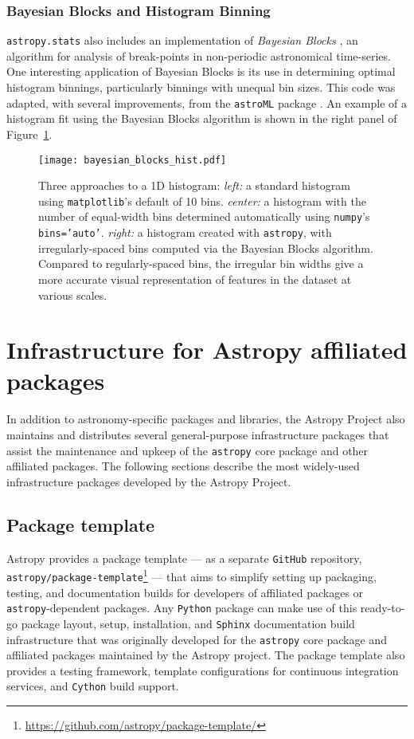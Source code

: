 \documentclass[modern]{aastex62}
\newcommand{\package}[1]{\texttt{#1}\xspace}
\newcommand{\github}{\package{GitHub}}
\newcommand{\python}{\package{Python}}
\newcommand{\astropy}{Astropy\xspace}
\newcommand{\astropypkg}{\package{astropy}}
\renewcommand{\figurename}{Figure\xspace}
\begin{document}
\subsubsection{Bayesian Blocks and Histogram Binning}
\package{astropy.stats} also includes an implementation of
{\it Bayesian Blocks} \citep{Scargle2013}, an algorithm for analysis of
break-points in non-periodic astronomical time-series. One interesting
application of Bayesian Blocks is its use in determining optimal histogram
binnings, particularly binnings with unequal bin sizes.
This code was adapted, with several improvements, from the \package{astroML}
package \citep{astroML}. An example of a histogram fit using the Bayesian
Blocks algorithm is shown in the right panel of
\figurename~\ref{fig:bayes-blocks-hist}.

\begin{figure}
\texttt{[image: bayesian\_blocks\_hist.pdf]}
\caption{%
    Three approaches to a 1D histogram:
    {\it left:} a standard histogram using \package{matplotlib}'s default of 10 bins.
    {\it center:} a histogram with the number of equal-width bins determined automatically using \package{numpy}'s {\tt bins='auto'}.
    {\it right:} a histogram created with \astropypkg, with irregularly-spaced bins computed via the Bayesian Blocks algorithm.
    Compared to regularly-spaced bins, the irregular bin widths give a more accurate visual representation of features in the dataset at various scales.
    \label{fig:bayes-blocks-hist}
}
\end{figure}

\section{Infrastructure for Astropy affiliated packages}

\label{sec:infrastructure}

In addition to astronomy-specific packages and libraries, the \astropy Project
also maintains and distributes several general-purpose infrastructure packages
that assist the maintenance and upkeep of the \astropypkg core package and
other affiliated packages.
The following sections describe the most widely-used infrastructure packages
developed by the \astropy Project.

\subsection{Package template}

\astropy provides a package template --- as a separate \github repository,
\package{astropy/package-template}\footnote{\url{https://github.com/astropy/package-template/}}
--- that aims to simplify setting up packaging, testing, and
documentation builds for developers of affiliated packages or
\astropypkg-dependent packages.
Any \python package can make use of this ready-to-go package layout, setup,
installation, and \package{Sphinx} documentation build infrastructure that was
originally developed for the \astropypkg core package and affiliated packages
maintained by the \astropy project.
The package template also provides a testing framework, template configurations
for continuous integration services, and \package{Cython} build support.
\end{document}
